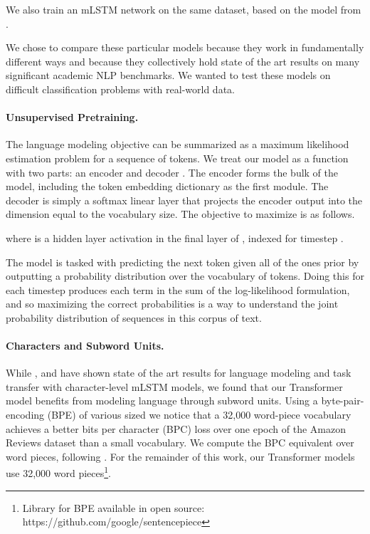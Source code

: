 \documentclass[letterpaper]{article} \usepackage{aaai19}  \usepackage{times}  \usepackage{helvet}  \usepackage{courier}  \usepackage{url}  \usepackage{graphicx}  \usepackage{booktabs}
\begin{document}
We also train an mLSTM network on the same dataset, based on the model from \protect\cite{Puri2018}. 

We chose to compare these particular models because they work in fundamentally different ways and because they collectively hold state of the art results on many significant academic NLP benchmarks. We wanted to test these models on difficult classification problems with real-world data. 


\paragraph{Unsupervised Pretraining.} 
The language modeling objective can be summarized as a maximum likelihood estimation problem for a sequence of tokens. We treat our model as a function with two parts: an encoder  and decoder . The encoder forms the bulk of the model, including the token embedding dictionary as the first module. The decoder is simply a softmax linear layer that projects the encoder output into the dimension equal to the vocabulary size. The objective to maximize is as follows. 

where  is a hidden layer activation in the final layer of , indexed  for timestep . 

The model is tasked with predicting the next token given all of the ones prior by outputting a probability distribution over the vocabulary of tokens. Doing this for each timestep  produces each term in the sum of the log-likelihood formulation, and so maximizing the correct probabilities is a way to understand the joint probability distribution of sequences in this corpus of text. 



\paragraph{Characters and Subword Units.}
While \protect\cite{Radford2017}, \protect\cite{Gray2017} and \cite{Puri2018} have shown state of the art results for language modeling and task transfer with character-level mLSTM models, we found that our Transformer model benefits from modeling language through subword units. Using a byte-pair-encoding (BPE) \protect\cite{BPE2015} of various sized we notice that a 32,000 word-piece vocabulary achieves a better bits per character (BPC) loss over one epoch of the Amazon Reviews dataset \protect\cite{McAuley2015} than a small vocabulary. We compute the BPC equivalent over word pieces, following \protect\cite{SubwordMikolov2012}. 
For the remainder of this work, our Transformer models use 32,000 word pieces\footnote{Library for BPE available in open source: https://github.com/google/sentencepiece}. 
\end{document}
